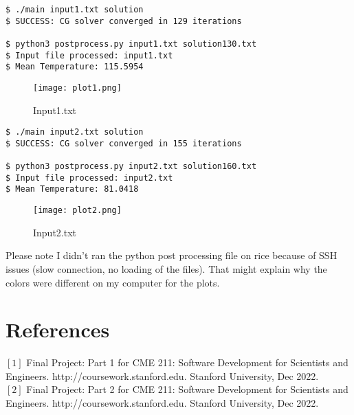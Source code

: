 \documentclass[12pt,a4paper]{article}
\begin{document}
\begin{verbatim}
$ ./main input1.txt solution
$ SUCCESS: CG solver converged in 129 iterations

$ python3 postprocess.py input1.txt solution130.txt
$ Input file processed: input1.txt
$ Mean Temperature: 115.5954
\end{verbatim}

\begin{figure}[h!]
  \centerline{\texttt{[image: plot1.png]}}
  \caption{Input1.txt}
  
\end{figure}

\begin{verbatim}
$ ./main input2.txt solution
$ SUCCESS: CG solver converged in 155 iterations

$ python3 postprocess.py input2.txt solution160.txt
$ Input file processed: input2.txt
$ Mean Temperature: 81.0418
\end{verbatim}

\begin{figure}[h!]
  \centerline{\texttt{[image: plot2.png]}}
  \caption{Input2.txt}
  
\end{figure}

\newpage\color{red}
Please note I didn't ran the python post processing file on rice because of SSH issues (slow connection, no loading of the files). That might explain why the colors were different on my computer for the plots.
\color{black}


\section{References}
$[1]$ Final Project: Part 1 for CME 211: Software Development for Scientists and Engineers. http://coursework.stanford.edu. Stanford University, Dec 2022.\\
$[2]$ Final Project: Part 2 for CME 211: Software Development for Scientists and Engineers. http://coursework.stanford.edu. Stanford University, Dec 2022.




 
\end{document}
